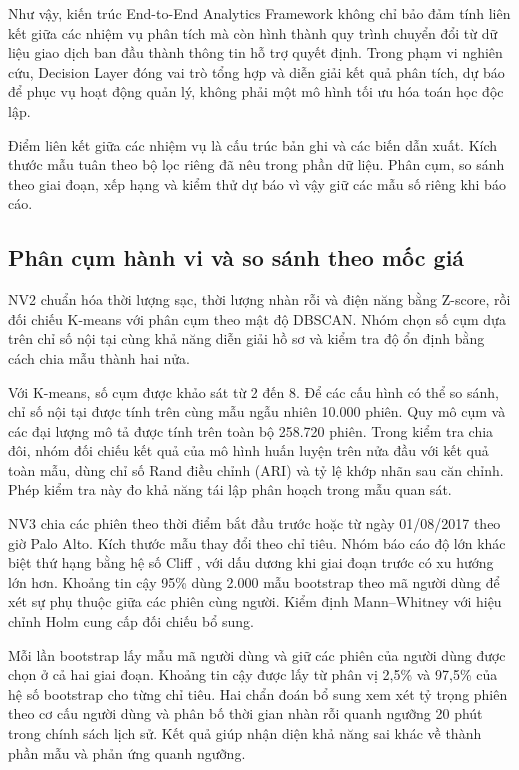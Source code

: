 \documentclass[conference,a4paper]{IEEEtran}
\begin{document}
Như vậy, kiến trúc End-to-End Analytics Framework không chỉ bảo đảm tính liên kết giữa các nhiệm vụ phân tích mà còn hình thành quy trình chuyển đổi từ dữ liệu giao dịch ban đầu thành thông tin hỗ trợ quyết định. Trong phạm vi nghiên cứu, Decision Layer đóng vai trò tổng hợp và diễn giải kết quả phân tích, dự báo để phục vụ hoạt động quản lý, không phải một mô hình tối ưu hóa toán học độc lập.

Điểm liên kết giữa các nhiệm vụ là cấu trúc bản ghi và các biến dẫn xuất. Kích thước mẫu tuân theo bộ lọc riêng đã nêu trong phần dữ liệu. Phân cụm, so sánh theo giai đoạn, xếp hạng và kiểm thử dự báo vì vậy giữ các mẫu số riêng khi báo cáo.



\subsection{Phân cụm hành vi và so sánh theo mốc giá}
NV2 chuẩn hóa thời lượng sạc, thời lượng nhàn rỗi và điện năng bằng Z-score, rồi đối chiếu K-means với phân cụm theo mật độ DBSCAN. Nhóm chọn số cụm dựa trên chỉ số nội tại cùng khả năng diễn giải hồ sơ và kiểm tra độ ổn định bằng cách chia mẫu thành hai nửa.

Với K-means, số cụm được khảo sát từ 2 đến 8. Để các cấu hình có thể so sánh, chỉ số nội tại được tính trên cùng mẫu ngẫu nhiên 10.000 phiên. Quy mô cụm và các đại lượng mô tả được tính trên toàn bộ 258.720 phiên. Trong kiểm tra chia đôi, nhóm đối chiếu kết quả của mô hình huấn luyện trên nửa đầu với kết quả toàn mẫu, dùng chỉ số Rand điều chỉnh (ARI) và tỷ lệ khớp nhãn sau căn chỉnh. Phép kiểm tra này đo khả năng tái lập phân hoạch trong mẫu quan sát.

NV3 chia các phiên theo thời điểm bắt đầu trước hoặc từ ngày 01/08/2017 theo giờ Palo Alto. Kích thước mẫu thay đổi theo chỉ tiêu. Nhóm báo cáo độ lớn khác biệt thứ hạng bằng hệ số Cliff \cite{cliff1993}, với dấu dương khi giai đoạn trước có xu hướng lớn hơn. Khoảng tin cậy 95\% dùng 2.000 mẫu bootstrap theo mã người dùng để xét sự phụ thuộc giữa các phiên cùng người. Kiểm định Mann--Whitney với hiệu chỉnh Holm \cite{holm1979} cung cấp đối chiếu bổ sung.

Mỗi lần bootstrap lấy mẫu mã người dùng và giữ các phiên của người dùng được chọn ở cả hai giai đoạn. Khoảng tin cậy được lấy từ phân vị 2,5\% và 97,5\% của hệ số bootstrap cho từng chỉ tiêu. Hai chẩn đoán bổ sung xem xét tỷ trọng phiên theo cơ cấu người dùng và phân bố thời gian nhàn rỗi quanh ngưỡng 20 phút trong chính sách lịch sử. Kết quả giúp nhận diện khả năng sai khác về thành phần mẫu và phản ứng quanh ngưỡng.
\end{document}
